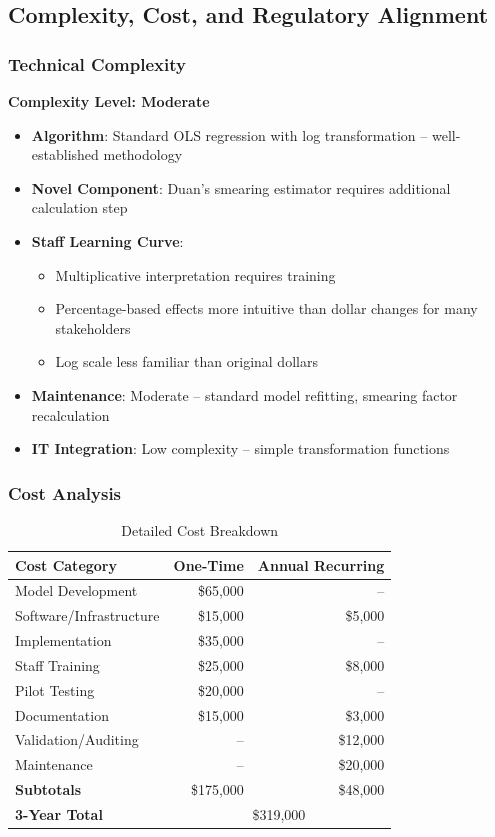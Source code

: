 \subsection{Complexity, Cost, and Regulatory Alignment}

\subsubsection{Technical Complexity}

\textbf{Complexity Level: Moderate}

\begin{itemize}
    \item \textbf{Algorithm}: Standard OLS regression with log transformation -- well-established methodology
    \item \textbf{Novel Component}: Duan's smearing estimator requires additional calculation step
    \item \textbf{Staff Learning Curve}: 
    \begin{itemize}
        \item Multiplicative interpretation requires training
        \item Percentage-based effects more intuitive than dollar changes for many stakeholders
        \item Log scale less familiar than original dollars
    \end{itemize}
    \item \textbf{Maintenance}: Moderate -- standard model refitting, smearing factor recalculation
    \item \textbf{IT Integration}: Low complexity -- simple transformation functions
\end{itemize}

\subsubsection{Cost Analysis}

\begin{table}[h]
\centering
\caption{Detailed Cost Breakdown}
\begin{tabular}{lrr}
\toprule
\textbf{Cost Category} & \textbf{One-Time} & \textbf{Annual Recurring} \\
\midrule
Model Development & \$65,000 & -- \\
Software/Infrastructure & \$15,000 & \$5,000 \\
Implementation & \$35,000 & -- \\
Staff Training & \$25,000 & \$8,000 \\
Pilot Testing & \$20,000 & -- \\
Documentation & \$15,000 & \$3,000 \\
Validation/Auditing & -- & \$12,000 \\
Maintenance & -- & \$20,000 \\
\midrule
\textbf{Subtotals} & \$175,000 & \$48,000 \\
\midrule
\textbf{3-Year Total} & \multicolumn{2}{c}{\$319,000} \\
\bottomrule
\end{tabular}
\end{table}

